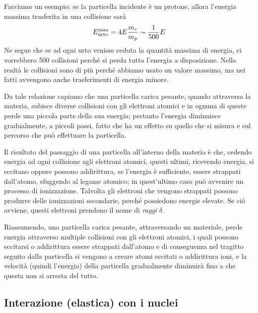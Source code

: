 Facciamo un esempio: se la particella incidente è un protone, allora l'energia massima trasferita in una collisione sarà
\begin{equation*}
    E_{\rm urto}^{\rm max}
    =4E\frac{m_e}{m_p}
    \sim \frac{1}{500} E
\end{equation*}
Ne segue che se ad ogni urto venisse ceduta la quantità massima di energia, ci vorrebbero 500 collisioni perché si perda tutta l'energia a disposizione. Nella realtà le collisioni sono di più perché abbiamo usato un valore massimo, ma nei fatti avvengono anche trasferimenti di energia minore.

Da tale relazione capiamo che una particella carica pesante, quando attraversa la materia, subisce diverse collisioni con gli elettroni atomici e in ognuna di queste perde una piccola parte della sua energia; pertanto l'energia diminuisce gradualmente, a piccoli passi, fatto che ha un effetto su quello che si misura e sul percorso che può effettuare la particella.

Il risultato del passaggio di una particella all'interno della materia è che, cedendo energia ad ogni collisione agli elettroni atomici, questi ultimi, ricevendo energia, si eccitano oppure possono addirittura, se l'energia è sufficiente, essere strappati dall'atomo, sfuggendo al legame atomico; in quest'ultimo caso può avvenire un processo di ionizzazione. Talvolta gli elettroni che vengono strappati possono produrre delle ionizzazioni secondarie, perché possiedono energie elevate. Se ciò avviene, questi elettroni prendono il nome di \textit{raggi} $\delta$.

Riassumendo, una particella carica pesante, attraversando un materiale, perde energia attraverso multiple collisioni con gli elettroni atomici, i quali possono eccitarsi o addirittura essere strappati dall'atomo e di conseguenza nel tragitto seguito dalla particella si vengono a creare atomi eccitati o addirittura ioni, e la velocità (quindi l'energia) della particella gradualmente diminuirà fino a che questa non si arresta del tutto.

\subsection{Interazione (elastica) con i nuclei}

